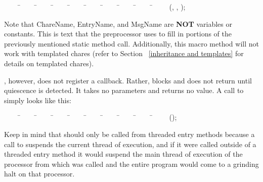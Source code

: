 \begin{tabbing}
~~~~ \=~~~~ \=~~~~ \=~~~~ \=~~~~ \=~~~~ \=~~~~ \=~~~~ \=~~~~ \=~~~~ \kill
\> (, , );
\end{tabbing}

Note that ChareName, EntryName, and MsgName are {\bf NOT} variables or
constants. This is text that the preprocessor uses to fill in portions of the
previously mentioned static method call.  Additionally, this macro method will
not work with templated chares (refer to Section ~\ref{inheritance and
templates} for details on templated chares).

, however, does not register a callback.  Rather,
 blocks and does not return until quiescence is
detected.  It takes no parameters and returns no value.  A call to
 simply looks like this: 

\begin{tabbing}
~~~~ \=~~~~ \=~~~~ \=~~~~ \=~~~~ \=~~~~ \=~~~~ \=~~~~ \=~~~~ \=~~~~ \kill
\> ();
\end{tabbing}

Keep in mind that  should only be called from threaded
entry methods because a call to  suspends the
current thread of execution, and if it were called outside of a threaded entry
method it would suspend the main thread of execution of the processor from
which  was called and the entire program would come to a grinding
halt on that processor.

